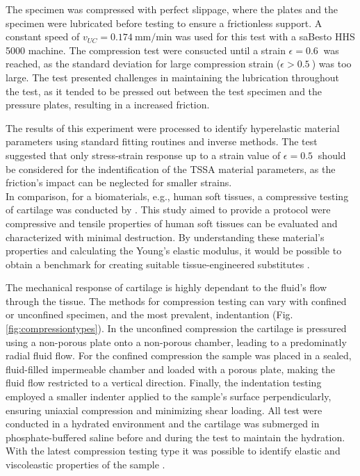 The specimen was compressed with perfect slippage, where the plates and the specimen were lubricated 
before testing to ensure a frictionless support. A constant speed of $v_{UC}=\SI[per-mode = symbol]{0.174}{\milli \m\per \minute}$
was used for this test with a saBesto HHS 5000 machine. The compression test were consucted until a strain $\epsilon=\SI{0.6}{}$ 
was reached, as the standard deviation for large compression strain ($\epsilon > \SI{0.5}{}$) was too large.
The test presented challenges in maintaining the lubrication throughout the test, as it tended to be 
pressed out between the test specimen and the pressure plates, resulting in a increased friction. 

The results of this experiment were processed to identify hyperelastic material parameters using standard 
fitting routines and inverse methods. The test suggested that only stress-strain response up to a strain value of 
$\epsilon=\SI{0.5}{}$ should be considered for the indentification of the TSSA material parameters, as 
the friction's impact can be neglected for smaller strains.\\

In comparison, for a biomaterials, e.g., human soft tissues, a compressive testing of cartilage was conducted by \citet{Griffin2016}. 
This study aimed to provide a protocol were compressive and tensile properties of human soft tissues can be evaluated 
and characterized with minimal destruction. By understanding these material's properties and calculating the Young's 
elastic modulus, it would be possible to obtain a benchmark for creating suitable tissue-engineered substitutes \cite{Griffin2016}. 

The mechanical response of cartilage is highly dependant to the fluid's flow through the tissue. The methods for compression 
testing can vary with confined or unconfined specimen, and the most prevalent, indentantion (Fig. \ref{fig:compressiontypes}).
In the unconfined compression the cartilage is pressured using a non-porous plate onto a non-porous chamber, 
leading to a predominatly radial fluid flow. For the confined compression the sample was placed in a sealed, 
fluid-filled impermeable chamber and loaded with a porous plate, making the fluid flow restricted to a vertical direction.
Finally, the indentation testing employed a smaller indenter applied to the sample's surface perpendicularly, ensuring 
uniaxial compression and minimizing shear loading. All test were conducted in a 
hydrated environment and the cartilage was submerged in phosphate-buffered saline before and during the test to maintain 
the hydration. With the latest compression testing type it was possible to identify elastic and viscoleastic properties 
of the sample \cite{Griffin2016}.


